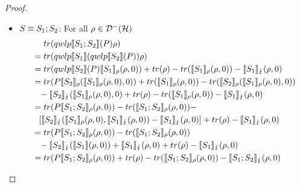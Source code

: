 \documentclass[a4paper,UKenglish,cleveref, autoref, thm-restate]{lipics-v2021}
\begin{document}
\begin{proof}
\begin{itemize}
        \item $S\equiv S_1;S_2$: For all $\rho \in \mathcal{D}^- (\mathcal{H})$
        \begin{align*}
            &\phantom{=.} tr(qwlp\llbracket S_1;S_2 \rrbracket (P)\rho) \\
            &= tr(qwlp\llbracket S_1 \rrbracket (qwlp\llbracket S_2 \rrbracket (P)) \rho)\\
            &= tr(qwlp\llbracket S_2 \rrbracket (P) \llbracket S_1 \rrbracket_{\rho}(\rho,0)) + tr(\rho)-tr(\llbracket S_1 \rrbracket_{\rho}(\rho,0))- \llbracket S_1 \rrbracket_{\lightning}(\rho,0)\\
            &= tr(P \llbracket S_2 \rrbracket_{\rho}(\llbracket S_1 \rrbracket_{\rho}(\rho,0),0)) + tr(\llbracket S_1 \rrbracket_{\rho}(\rho,0))-tr(\llbracket S_2 \rrbracket_{\rho}(\llbracket S_1 \rrbracket_{\rho}(\rho,0),0))\\
            &\phantom{=} - \llbracket S_2 \rrbracket_{\lightning}(\llbracket S_1 \rrbracket_{\rho}(\rho,0),0) + tr(\rho)-tr(\llbracket S_1 \rrbracket_{\rho}(\rho,0))- \llbracket S_1 \rrbracket_{\lightning}(\rho,0)\\
            &= tr(P \llbracket S_1;S_2 \rrbracket_{\rho}(\rho,0)) - tr(\llbracket S_1;S_2 \rrbracket_{\rho}(\rho,0))- \\
            & \phantom{=}[\llbracket S_2 \rrbracket_{\lightning}(\llbracket S_1 \rrbracket_{\rho}(\rho,0),\llbracket S_1 \rrbracket_{\lightning}(\rho,0)) - \llbracket S_1 \rrbracket_{\lightning}(\rho,0)] + tr(\rho) - \llbracket S_1 \rrbracket_{\lightning}(\rho,0)\\
            &= tr(P \llbracket S_1;S_2 \rrbracket_{\rho}(\rho,0)) - tr(\llbracket S_1;S_2 \rrbracket_{\rho}(\rho,0))\\
            &\phantom{=}-\llbracket S_2 \rrbracket_{\lightning}(\llbracket S_1 \rrbracket(\rho,0)) + \llbracket S_1 \rrbracket_{\lightning}(\rho,0) + tr(\rho) - \llbracket S_1 \rrbracket_{\lightning}(\rho,0)\\
            &= tr(P \llbracket S_1;S_2 \rrbracket_{\rho}(\rho,0)) + tr(\rho)-tr(\llbracket S_1;S_2 \rrbracket_{\rho}(\rho,0))- \llbracket S_1;S_2 \rrbracket_{\lightning}(\rho,0)
        \end{align*}


\end{itemize}
\end{proof}
\end{document}
